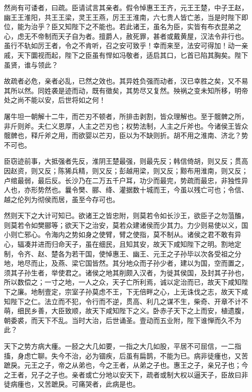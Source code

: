 \documentclass[UTF8,titlepage,oneside]{ctexbook}
\begin{document}
然尚有可诿者，曰疏。臣请试言其亲者。假令悼惠王王齐，元王王楚，中子王赵，幽王王淮阳，共王王梁，灵王王燕，厉王王淮南，六七贵人皆亡恙，当是时陛下即位，能为治乎？臣又知陛下之不能也。若此诸王，虽名为臣，实皆有布衣昆弟之心，虑无不帝制而天子自为者。擅爵人，赦死罪，甚者或戴黄屋，汉法令非行也。虽行不轨如厉王者，令之不肯听，召之安可致乎！幸而来至，法安可得加！动一亲戚，天下圜视而起，陛下之臣虽有悍如冯敬者，适启其口，匕首已陷其胸矣。陛下虽贤，谁与领此？


故疏者必危，亲者必乱，已然之效也。其异姓负强而动者，汉已幸胜之矣，又不易其所以然。同姓袭是迹而动，既有徵矣，其势尽又复然。殃祸之变未知所移，明帝处之尚不能以安，后世将如之何！


屠牛坦一朝解十二牛，而芒刃不顿者，所排击剥割，皆众理解也。至于髋髀之所，非斤则斧。夫仁义恩厚，人主之芒刃也；权势法制，人主之斤斧也。今诸侯王皆众髋髀也，释斤斧之用，而欲婴以芒刃，臣以为不缺则折。胡不用之淮南、济北？势不可也。


臣窃迹前事，大抵强者先反，淮阴王楚最强，则最先反；韩信倚胡，则又反；贯高因赵资，则又反；陈狶兵精，则又反；彭越用梁，则又反；黥布用淮南，则又反；卢绾最弱，最后反。长沙乃在二万五千户耳，功少而最完，势疏而最忠，非独性异人也，亦形势然也。曩令樊、郦、绛、灌据数十城而王，今虽以残亡可也；令信、越之伦列为彻侯而居，虽至今存可也。


然则天下之大计可知已。欲诸王之皆忠附，则莫若令如长沙王，欲臣子之勿菹醢，则莫若令如樊郦等；欲天下之治安，莫若众建诸侯而少其力。力少则易使以义，国小则亡邪心。令海内之势如身之使臂，臂之使指，莫不制从。诸侯之君不敢有异心，辐凑并进而归命天子，虽在细民，且知其安，故天下咸知陛下之明。割地定制，令齐、赵、楚各为若干国，使悼惠王、幽王、元王之子孙毕以次各受祖之分地，地尽而止，及燕、梁它国皆然。其分地众而子孙少者，建以为国，空而置之，须其子孙生者，举使君之。诸侯之地其削颇入汉者，为徙其侯国，及封其子孙也，所以数偿之；一寸之地，一人之众，天子亡所利焉，诚以定治而已，故天下咸知陛下之廉。地制壹定，宗室子孙莫虑不王，下无倍畔之心，上无诛伐之志，故天下咸知陛下之仁。法立而不犯，令行而不逆，贯高、利几之谋不生，柴奇、开章不计不萌，细民乡善，大臣致顺，故天下咸知陛下之义。卧赤子天下之上而安，植遗腹，朝委裘，而天下不乱。当时大治，后世诵圣。壹动而五业附，陛下谁惮而久不为此？


天下之势方病大瘇。一胫之大几如要，一指之大几如股，平居不可屈信，一二指搐，身虑亡聊。失今不治，必为锢疾，后虽有扁鹊，不能为已。病非徒瘇也，又苦蹠戾。元王之子，帝之从弟也，今之王者，从弟之子也。惠王之子，亲兄子也；今之王者，兄子之子也。亲者或亡分地以安天下，疏者或制大权以逼天子，臣故曰非徒病瘇也，又苦蹠戾。可痛哭者，此病是也。
\end{document}

